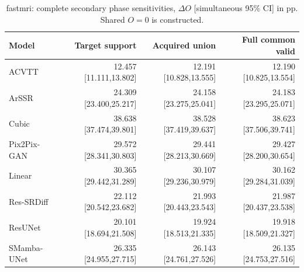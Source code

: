 \begin{table}[t]\centering\scriptsize

\caption{fastmri: complete secondary phase sensitivities, $\Delta O$ [simultaneous 95\% CI] in pp. Shared $O=0$ is constructed.}

\begin{tabular}{lrrr}\toprule Model & Target support & Acquired union & Full common valid\\\midrule

ACVTT & 12.457 [11.111,13.802] & 12.191 [10.828,13.555] & 12.190 [10.825,13.554]\\

ArSSR & 24.309 [23.400,25.217] & 24.158 [23.275,25.041] & 24.183 [23.295,25.071]\\

Cubic & 38.638 [37.474,39.801] & 38.528 [37.419,39.637] & 38.623 [37.506,39.741]\\

Pix2Pix-GAN & 29.572 [28.341,30.803] & 29.441 [28.213,30.669] & 29.427 [28.200,30.654]\\

Linear & 30.365 [29.442,31.289] & 30.107 [29.236,30.979] & 30.162 [29.284,31.039]\\

Res-SRDiff & 22.112 [20.542,23.682] & 21.993 [20.443,23.543] & 21.987 [20.437,23.538]\\

ResUNet & 20.101 [18.694,21.508] & 19.924 [18.513,21.335] & 19.918 [18.509,21.327]\\

SMamba-UNet & 26.335 [24.955,27.715] & 26.143 [24.761,27.526] & 26.135 [24.753,27.516]\\

\bottomrule\end{tabular}\end{table}

